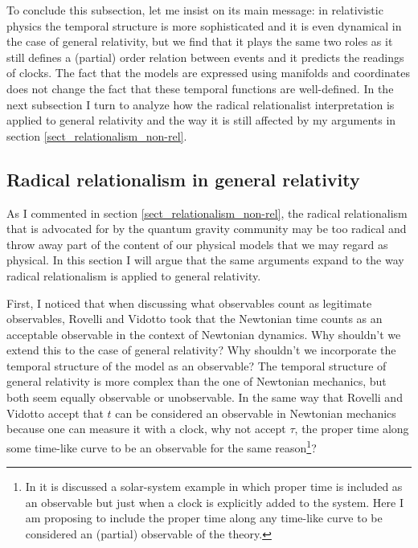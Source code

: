 \documentclass[12 pt]{article}
\begin{document}
To conclude this subsection, let me insist on its main message: in relativistic physics the temporal structure is more sophisticated and it is even dynamical in the case of general relativity, but we find that it plays the same two roles as it still defines a (partial) order relation between events and it predicts the readings of clocks. The fact that the models are expressed using manifolds and coordinates does not change the fact that these temporal functions are well-defined. In the next subsection I turn to analyze how the radical relationalist interpretation is applied to general relativity and the way it is still affected by my arguments in section \ref{sect_relationalism_non-rel}.


\subsection{Radical relationalism in general relativity} \label{sect_relationalism_general_relativity}

As I commented in section \ref{sect_relationalism_non-rel}, the radical relationalism that is advocated for by the quantum gravity community may be too radical and throw away part of the content of our physical models that we may regard as physical. In this section I will argue that the same arguments expand to the way radical relationalism is applied to general relativity.

First, I noticed that when discussing what observables count as legitimate observables, Rovelli and Vidotto took that the Newtonian time counts as an acceptable observable in the context of Newtonian dynamics. Why shouldn't we extend this to the case of general relativity? Why shouldn't we incorporate the temporal structure of the model as an observable? The temporal structure of general relativity is more complex than the one of Newtonian mechanics, but both seem equally observable or unobservable. In the same way that Rovelli and Vidotto accept that $t$ can be considered an observable in Newtonian mechanics because one can measure it with a clock, why not accept $\tau$, the proper time along some time-like curve to be an observable for the same reason\footnote{In \citep[pp. 51-52]{Rovelli2004} it is discussed a solar-system example in which proper time is included as an observable but just when a clock is explicitly added to the system. Here I am proposing to include the proper time along any time-like curve to be considered an (partial) observable of the theory.}?
\end{document}

